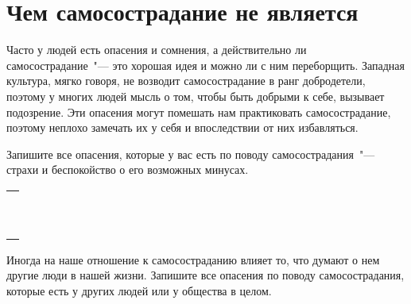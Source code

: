 
\chapter{Чем самосострадание не является} \label{What_Self-Compassion_Is_Not}

Часто у людей есть опасения и сомнения, а действительно ли самосострадание~"--- это хорошая идея и можно ли с ним переборщить. Западная культура, мягко говоря, не возводит самосострадание в ранг добродетели, поэтому у многих людей мысль о том, чтобы быть добрыми к себе, вызывает подозрение. Эти опасения могут помешать нам практиковать самосострадание, поэтому неплохо замечать их у себя и впоследствии от них избавляться.

\vspace{4ex}


\begin{itemize}
	\itemWritingHand Запишите все опасения, которые у вас есть по поводу самосострадания~"--- страхи и беспокойство о его возможных минусах.
	
\end{itemize}

\setlength{\extrarowheight}{2mm}
\begin{tabularx}{\textwidth}{X}
	\\
	\arrayrulecolor{gray}\hline\\
	\hline\\
	\hline\\
	\hline\\
	\hline\\
	\hline\\
	\hline\\
	\hline\\
	\hline\\
	\hline\\
	\hline\\	
\end{tabularx}
\setlength{\extrarowheight}{0mm}

\begin{itemize}
	\itemWritingHand Иногда на наше отношение к самосостраданию влияет то, что думают о нем другие люди в нашей жизни. Запишите все опасения по поводу самосострадания, которые есть у других людей или у общества в целом.
\end{itemize}

